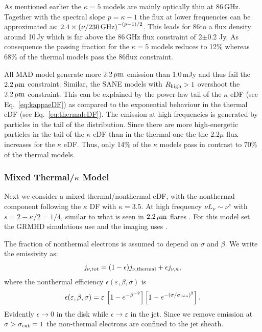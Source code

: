 As mentioned earlier the $\kappa=5$ models are mainly optically thin at 86\,GHz.
Together with the spectral slope $p=\kappa-1$ the flux at lower frequencies can be approximated as: $2.4\times \left(\nu/230\,\rm{GHz}\right)^{-(p-1)/2}$.
This leads for 86\GHz to a flux density around 10\,Jy which is far above the 86\,GHz flux constraint of 2$\pm$0.2 Jy.
As consequence the passing fraction for the $\kappa=5$ models reduces to 12\% whereas 68\% of the thermal models pass the 86\GHz flux constraint.


All MAD model generate more $2.2\,\mu\mathrm{m}$ emission than 1.0\,mJy and thus fail the $2.2\,\mu\mathrm{m}$ constraint.
Similar, the SANE models with $R_{\rm high}>1$ overshoot the $2.2\,\mu\mathrm{m}$ constraint.
This can be explained by the power-law tail of the $\kappa$ eDF (see Eq.~\ref{eq:kappaeDF}) as compared to the exponential behaviour in the thermal eDF (see Eq.~\ref{eq:thermaleDF}).
The emission at high frequencies is generated by particles in the tail of the distribution.
Since there are more high-energetic particles in the tail of the $\kappa$ eDF than in the thermal one the the $2.2\mu$ flux increases for the $\kappa$ eDF.
Thus, only 14\% of the $\kappa$ models pass in contrast to 70\% of the thermal models.

\subsubsection{Mixed Thermal/\texorpdfstring{$\kappa$}{kappa} Model}

Next we consider a mixed thermal/nonthermal eDF, with the nonthermal component following the $\kappa$ DF with $\kappa = 3.5$.
At high frequency $\nu L_\nu \sim \nu^s$ with $s = 2 - \kappa/2 = 1/4$, similar to what is seen in $2.2\,\mu\mathrm{m}$ flares \citep{2007ApJ...667..900H}.
For this model set the GRMHD simulations use \bhac and the imaging uses \bhoss.

The fraction of nonthermal electrons is assumed to depend on $\sigma$ and $\beta$.
We write the emissivity as:
\begin{equation}
j_{\nu,\rm{tot}}=(1-\epsilon) j_{\nu,\rm{thermal}} + \epsilon j_{\nu, \kappa},
\label{eq:kappaeff}
\end{equation}
where the nonthermal efficiency $\epsilon( \varepsilon, \beta, \sigma)$ is
\begin{equation}
    \epsilon(\varepsilon,\beta,\sigma)=\varepsilon\,
    \left[1 - e^{-\beta^{-2}}\right]
    \left[1-e^{-(\sigma/\sigma_{\rm min})^2}\right].
    \label{eq:efficiencybetasigma}
\end{equation}
Evidently $\epsilon \rightarrow 0$ in the disk while $\epsilon \rightarrow \varepsilon$ in the jet.
Since we remove emission at $\sigma > \sigma_{\rm cut} = 1$ the non-thermal electrons are confined to the jet sheath.

